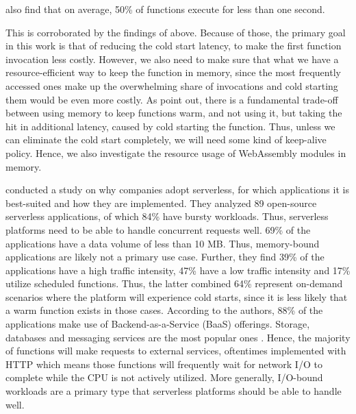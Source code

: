 \citeauthor{Shahrad2020} also find that on average, 50\% of functions execute for less than one second.

\begin{quote}
\end{quote}

This is corroborated by the findings of \citeauthor{Wang2018} above.
Because of those, the primary goal in this work is that of reducing the cold start latency, to make the first function invocation less costly. However, we also need to make sure that what we have a resource-efficient way to keep the function in memory, since the most frequently accessed ones make up the overwhelming share of invocations and cold starting them would be even more costly.
As \citeauthor{Shahrad2020} point out, there is a fundamental trade-off between using memory to keep functions warm, and not using it, but taking the hit in additional latency, caused by cold starting the function. Thus, unless we can eliminate the cold start completely, we will need some kind of keep-alive policy. Hence, we also investigate the resource usage of WebAssembly modules in memory.

\citeauthor{Eismann2021} conducted a study on why companies adopt serverless, for which applications it is best-suited and how they are implemented. They analyzed 89 open-source serverless applications, of which 84\% have bursty workloads. Thus, serverless platforms need to be able to handle concurrent requests well. 69\% of the applications have a data volume of less than 10 MB. Thus, memory-bound applications are likely not a primary use case. Further, they find 39\% of the applications have a high traffic intensity, 47\% have a low traffic intensity and 17\% utilize scheduled functions. Thus, the latter combined 64\% represent on-demand scenarios where the platform will experience cold starts, since it is less likely that a warm function exists in those cases. According to the authors, 88\% of the applications make use of Backend-as-a-Service (BaaS) offerings. Storage, databases and messaging services are the most popular ones \cite{Eismann2021}. Hence, the majority of functions will make requests to external services, oftentimes implemented with HTTP which means those functions will frequently wait for network I/O to complete while the CPU is not actively utilized. More generally, I/O-bound workloads are a primary type that serverless platforms should be able to handle well.

